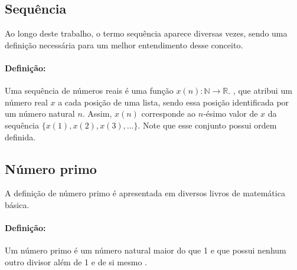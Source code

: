\documentclass[12pt,a4paper,fleqn]{report}
\begin{document}
\subsection{Sequência}

Ao longo deste trabalho, o termo sequência aparece diversas vezes, sendo
uma definição necessária para um melhor entendimento desse conceito.

\paragraph*{Definição:}

Uma sequência de números reais é uma função $x(n):\mathbb{N}\to\mathbb{R}$.
\cite{lima76}, que atribui um número real $x$ a cada posição de uma lista, sendo essa posição identificada por um número natural $n$. Assim, $x(n)$ corresponde ao  $n$-ésimo valor de $x$ 
da sequência $\{x(1),x(2),x(3),\ldots\}$. Note que esse conjunto  possui ordem
definida.






\subsection{Número primo}

A definição de número primo é apresentada em diversos  livros
de matemática básica.

\paragraph*{Definição:} Um número primo é um número natural maior do que 1 e que possui
nenhum outro divisor além de 1 e de si mesmo \cite{knuth}.
\end{document}
